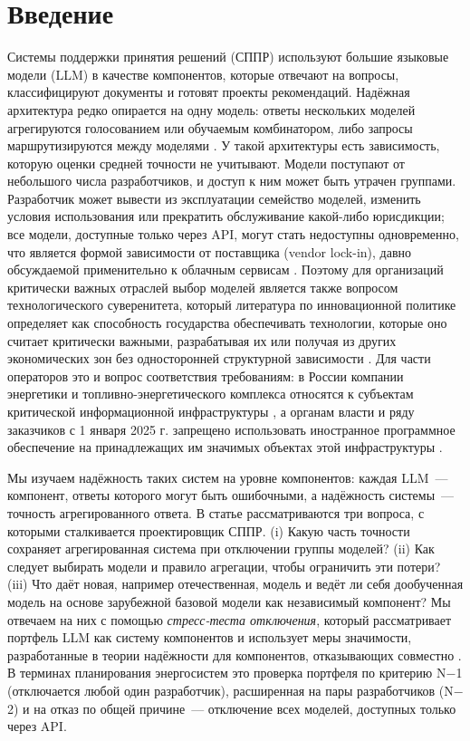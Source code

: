 \documentclass[preprint,12pt,authoryear]{elsarticle}
\begin{document}
\section{Введение}

Системы поддержки принятия решений (СППР) используют большие языковые модели (LLM) в качестве компонентов, которые отвечают на вопросы, классифицируют документы и готовят проекты рекомендаций. Надёжная архитектура редко опирается на одну модель: ответы нескольких моделей агрегируются голосованием или обучаемым комбинатором, либо запросы маршрутизируются между моделями \citep{jiang2023blender,wang2025moa,chen2024frugalgpt,ong2025routellm}. У такой архитектуры есть зависимость, которую оценки средней точности не учитывают. Модели поступают от небольшого числа разработчиков, и доступ к ним может быть утрачен группами. Разработчик может вывести из эксплуатации семейство моделей, изменить условия использования или прекратить обслуживание какой-либо юрисдикции; все модели, доступные только через API, могут стать недоступны одновременно, что является формой зависимости от поставщика (vendor lock-in), давно обсуждаемой применительно к облачным сервисам \citep{oparamartins2016}. Поэтому для организаций критически важных отраслей выбор моделей является также вопросом технологического суверенитета, который литература по инновационной политике определяет как способность государства обеспечивать технологии, которые оно считает критически важными, разрабатывая их или получая из других экономических зон без односторонней структурной зависимости \citep{edler2023}. Для части операторов это и вопрос соответствия требованиям: в России компании энергетики и топливно-энергетического комплекса относятся к субъектам критической информационной инфраструктуры \citep{fz187}, а органам власти и ряду заказчиков с 1 января 2025 г. запрещено использовать иностранное программное обеспечение на принадлежащих им значимых объектах этой инфраструктуры \citep{ukaz166}.

Мы изучаем надёжность таких систем на уровне компонентов: каждая LLM~--- компонент, ответы которого могут быть ошибочными, а надёжность системы~--- точность агрегированного ответа. В статье рассматриваются три вопроса, с которыми сталкивается проектировщик СППР. (i) Какую часть точности сохраняет агрегированная система при отключении группы моделей? (ii) Как следует выбирать модели и правило агрегации, чтобы ограничить эти потери? (iii) Что даёт новая, например отечественная, модель и ведёт ли себя дообученная модель на основе зарубежной базовой модели как независимый компонент? Мы отвечаем на них с помощью \emph{стресс-теста отключения}, который рассматривает портфель LLM как систему компонентов и использует меры значимости, разработанные в теории надёжности для компонентов, отказывающих совместно \citep{birnbaum1969,vesely1983,borgonovo2001,honglie1993}. В терминах планирования энергосистем это проверка портфеля по критерию N$-$1 (отключается любой один разработчик), расширенная на пары разработчиков (N$-$2) и на отказ по общей причине~--- отключение всех моделей, доступных только через API.
\end{document}
